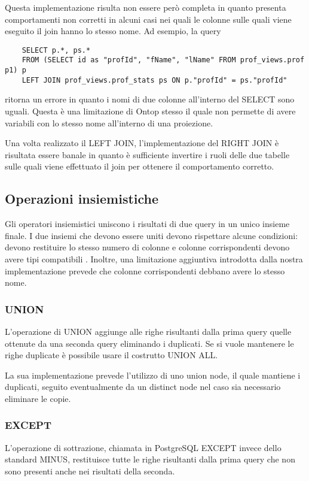 Questa implementazione risulta non essere però completa in quanto presenta comportamenti non corretti in alcuni casi nei quali le colonne sulle quali viene eseguito il join hanno lo stesso nome.
Ad esempio, la query 
\begin{verbatim}
    SELECT p.*, ps.*
    FROM (SELECT id as "profId", "fName", "lName" FROM prof_views.prof p1) p
    LEFT JOIN prof_views.prof_stats ps ON p."profId" = ps."profId"
\end{verbatim}
ritorna un errore in quanto i nomi di due colonne all'interno del SELECT sono uguali. Questa è una limitazione di Ontop stesso il quale non permette di avere variabili
con lo stesso nome all'interno di una proiezione.

Una volta realizzato il LEFT JOIN, l'implementazione del RIGHT JOIN è risultata essere banale in quanto è sufficiente invertire i ruoli delle due tabelle sulle quali viene effettuato 
il join per ottenere il comportamento corretto.

\subsection{Operazioni insiemistiche}
Gli operatori insiemistici uniscono i risultati di due query in un unico insieme finale. I due insiemi che devono essere uniti devono rispettare alcune condizioni:
devono restituire lo stesso numero di colonne e colonne corrispondenti devono avere tipi compatibili \cite{PGSetOp}. Inoltre, una limitazione aggiuntiva introdotta dalla nostra 
implementazione prevede che colonne corrispondenti debbano avere lo stesso nome.

\subsubsection*{UNION}
L'operazione di UNION aggiunge alle righe risultanti dalla prima query quelle ottenute da una seconda query eliminando i duplicati. Se si vuole mantenere le righe duplicate è possibile
usare il costrutto UNION ALL.

La sua implementazione prevede l'utilizzo di uno union node, il quale mantiene i duplicati, seguito eventualmente da un distinct node nel caso sia necessario eliminare le copie. 

\subsubsection*{EXCEPT}
L'operazione di sottrazione, chiamata in PostgreSQL EXCEPT invece dello standard MINUS, restituisce tutte le righe risultanti dalla prima query che non sono presenti anche nei 
risultati della seconda. 

